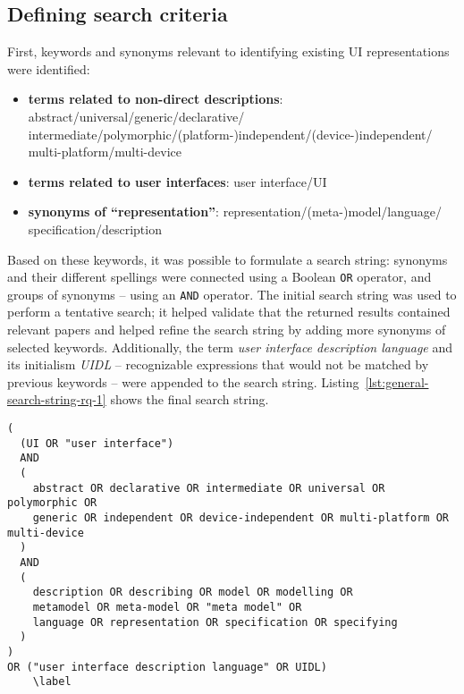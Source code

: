 \subsection{Defining search criteria}\label{subsec:defining-search-criteria}
First, keywords and synonyms relevant to identifying existing UI representations were identified:
\begin{itemize}
    \item \textbf{terms related to non-direct descriptions}: abstract/universal/generic/declarative/\\intermediate/polymorphic/(platform-)independent/(device-)independent/\\multi-platform/multi-device
    \item \textbf{terms related to user interfaces}: user interface/UI
    \item \textbf{synonyms of \enquote{representation}}: representation/(meta-)model/language/\\specification/description
\end{itemize}
Based on these keywords, it was possible to formulate a search string: synonyms and their different spellings were connected using a Boolean \texttt{OR} operator, and groups of synonyms -- using an \texttt{AND} operator.
The initial search string was used to perform a tentative search;
it helped validate that the returned results contained relevant papers and helped refine the search string by adding more synonyms of selected keywords.
Additionally, the term \emph{user interface description language} and its initialism \emph{UIDL} -- recognizable expressions that would not be matched by previous keywords -- were appended to the search string.
Listing~\ref{lst:general-search-string-rq-1} shows the final search string.

\vspace{10pt}
\begin{minipage}[c]{\textwidth}
\begin{lstlisting}[label=lst:general-search-string-rq-1,caption=The search string, basicstyle=\ttfamily,captionpos=b]
(
  (UI OR "user interface")
  AND
  (
    abstract OR declarative OR intermediate OR universal OR polymorphic OR
    generic OR independent OR device-independent OR multi-platform OR multi-device
  )
  AND
  (
    description OR describing OR model OR modelling OR
    metamodel OR meta-model OR "meta model" OR
    language OR representation OR specification OR specifying
  )
)
OR ("user interface description language" OR UIDL)
    \label
\end{lstlisting}
\end{minipage}
\vspace{10pt}

